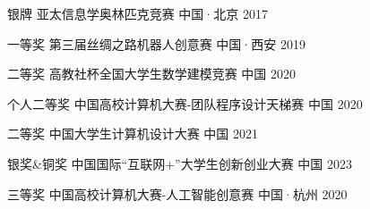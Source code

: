









\begin{cvhonors}

\cvhonor
{银牌} %
{亚太信息学奥林匹克竞赛} %
{中国·北京} %
{2017} %

\cvhonor
{一等奖} %
{第三届丝绸之路机器人创意赛} %
{中国·西安} %
{2019} %

\cvhonor
{二等奖} %
{高教社杯全国大学生数学建模竞赛} %
{中国} %
{2020} %

\cvhonor
{个人二等奖} %
{中国高校计算机大赛-团队程序设计天梯赛} %
{中国} %
{2020} %

\cvhonor
{二等奖} %
{中国大学生计算机设计大赛} %
{中国} %
{2021} %


\cvhonor
{银奖\&铜奖} %
{中国国际“互联网+”大学生创新创业大赛} %
{中国} %
{2023} %

\cvhonor
{三等奖} %
{中国高校计算机大赛-人工智能创意赛} %
{中国·杭州} %
{2020} %

\end{cvhonors}

